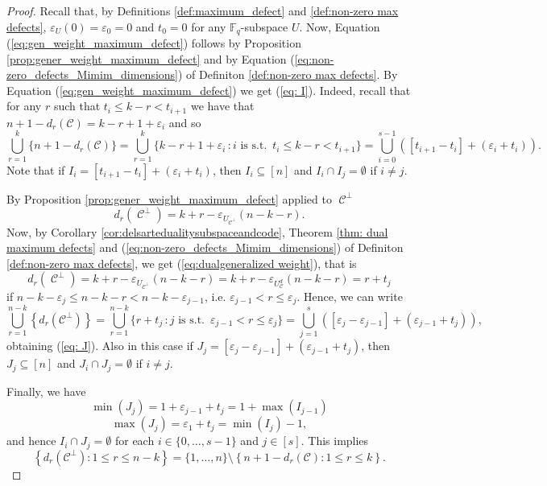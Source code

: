 \documentclass[11pt]{amsart}
\DeclareMathOperator{\C}{\mathcal{C}}
\newcommand{\fq}{{\mathbb F}_{q}}
\begin{document}
\begin{proof}
    Recall that, by Definitions \ref{def:maximum_defect} and 
    \ref{def:non-zero max defects},   $\varepsilon_{U}(0)=\varepsilon_0=0$ and $t_0=0$ for any $\fq$-subspace $U$. Now, Equation (\ref{eq:gen_weight_maximum_defect}) follows by Proposition \ref{prop:gener_weight_maximum_defect} and by  Equation (\ref{eq:non-zero_defects_Mimim_dimensions}) of Definiton \ref{def:non-zero max defects}. By  Equation (\ref{eq:gen_weight_maximum_defect}) we get (\ref{eq: I}). Indeed, recall that for any $r$ such that $t_i\leq k-r <t_{i+1}$ we have that $n+1-d_r(\mathcal{C})=k-r+1+\varepsilon_{i}$ and so
    \[\bigcup_{r=1}^k\{n+1-d_r(\mathcal{C})\}=\bigcup_{r=1}^{k}\{k-r+1+\varepsilon_{i}\,\colon i \text{ is s.t. } \, t_i\leq k-r <t_{i+1}  \}=\bigcup_{i=0}^{s-1} ([t_{i+1}-t_i]+(\varepsilon_i+t_i)).\]
    Note that if $I_i=[t_{i+1}-t_i]+(\varepsilon_i+t_i) $, then $I_i\subseteq [n]$ and  $I_i\cap I_j=\emptyset$ if $i\neq j$. 

    By Proposition \ref{prop:gener_weight_maximum_defect} applied to $\C^\perp$
    \[d_{r}(\C^\perp)=k+r-\varepsilon_{U_{\C^\perp}}(n-k-r).\]
Now, by Corollary \ref{cor:delsartedualitysubspaceandcode}, Theorem \ref{thm: dual maximum defects} and  (\ref{eq:non-zero_defects_Mimim_dimensions}) of Definiton \ref{def:non-zero max defects}, 
   we get (\ref{eq:dualgeneralized weight}), that is
   \[d_{r}(\C^\perp)=k+r-\varepsilon_{U_{\C^\perp}}(n-k-r)=k+r-\varepsilon_{U_{\C}^d}(n-k-r)=r+t_j\]
   if $n-k-\varepsilon_j \leq n-k-r < n-k-\varepsilon_{j-1}$, i.e. $\varepsilon_{j-1}< r\leq \varepsilon_{j}$. Hence, we can write 
   \[
            \bigcup_{r=1}^{n-k}\left\{d_r(\mathcal{C}^\perp)\right\}=\bigcup_{r=1}^{n-k}\{r+t_j\,\colon j \text{ is s.t. }\, \varepsilon_{j-1}< r\leq \varepsilon_{j}  \}=\bigcup_{j=1}^{s} ([\varepsilon_{j}-\varepsilon_{j-1}]+(\varepsilon_{j-1}+t_j)),\]
            obtaining (\ref{eq: J}).
            Also in this case if $J_j=[\varepsilon_{j}-\varepsilon_{j-1}]+(\varepsilon_{j-1}+t_j)$, then $J_j \subseteq [n]$ and $J_i\cap J_j=\emptyset$ if $i\neq j$.

            Finally, we have
    \[\min (J_j)=1+\varepsilon_{j-1}+t_j=1+\max (I_{j-1})\]
    \[\max (J_j)=\varepsilon_{1}+t_j=\min (I_{j})-1,\]
    and hence $I_i\cap J_j=\emptyset$ for each $i\in \{0,\dots,s-1\}$ and $j\in [s]$. This implies     
    \[
            \left\{d_r(\mathcal{C}^\perp)\colon 1 \leq r \leq n-k\right\}=\{1, \ldots, n\}\setminus\left\{n+1-d_r(\mathcal{C})\colon 1 \leq r \leq k\right\}.
            \] 
\end{proof}
\end{document}
